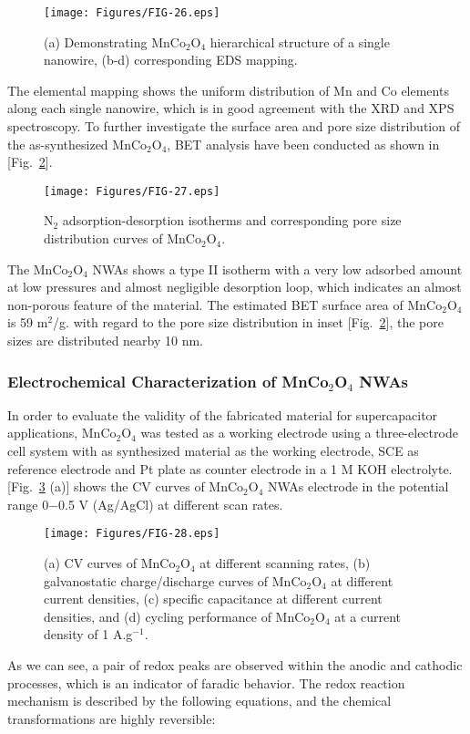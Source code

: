 \documentclass[reprint,amsmath,amssymb,aps,floatfix,
]{revtex4-2}
\begin{document}
\begin{figure}[b]
    \centering
    \texttt{[image: Figures/FIG-26.eps]}
    \caption{\label{fig:fig26}(a) Demonstrating MnCo$_2$O$_4$ hierarchical structure of a single nanowire, (b-d) corresponding EDS mapping.}
    \end{figure}
The elemental mapping shows the uniform distribution of Mn and Co elements along each single nanowire, which is in good agreement with the XRD and XPS spectroscopy. To further investigate the surface area and pore size distribution of the as-synthesized MnCo$_2$O$_4$, BET analysis have been conducted as shown in [Fig.~\ref{fig:fig27}].
\begin{figure}[t]
    \centering
    \texttt{[image: Figures/FIG-27.eps]}
    \caption{\label{fig:fig27}N$_2$ adsorption-desorption isotherms and corresponding pore size distribution curves of MnCo$_2$O$_4$.}
    \end{figure}
The MnCo$_2$O$_4$ NWAs shows a type II isotherm with a very low adsorbed amount at low pressures and almost negligible desorption loop, which indicates an almost non-porous feature of the material. The estimated BET surface area of MnCo$_2$O$_4$ is 59 m$^2$/g. with regard to the pore size distribution in inset [Fig.~\ref{fig:fig27}], the pore sizes are distributed nearby 10 nm.
\subsubsection{Electrochemical Characterization of MnCo$_2$O$_4$ NWAs}
In order to evaluate the validity of the fabricated material for supercapacitor applications, MnCo$_2$O$_4$ was tested as a working electrode using a three-electrode cell system with as synthesized material as the working electrode, SCE as reference electrode and Pt plate as counter electrode in a 1 M KOH electrolyte. [Fig.~\ref{fig:fig28} (a)] shows the CV curves of MnCo$_2$O$_4$ NWAs electrode in the potential range 0$-$0.5 V (Ag/AgCl) at different scan rates.
\begin{figure}[b]
    \centering
    \texttt{[image: Figures/FIG-28.eps]}
    \caption{\label{fig:fig28}(a) CV curves of MnCo$_2$O$_4$ at different scanning rates, (b) galvanostatic charge/discharge curves of MnCo$_2$O$_4$ at different current densities, (c) specific capacitance at different current densities, and (d) cycling performance of MnCo$_2$O$_4$ at a current density of 1 A.g$^{-1}$.}
    \end{figure}
As we can see, a pair of redox peaks are observed within the anodic and cathodic processes, which is an indicator of faradic behavior. The redox reaction mechanism is described by the following equations, and the chemical transformations are highly reversible:\cite{hui2012}
\end{document}
